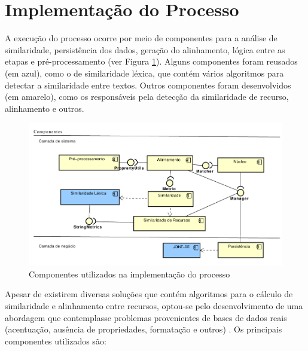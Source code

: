 \section{Implementação do Processo}
\label{sec:componentes}
A execução do processo ocorre por meio de componentes para a análise de similaridade, persistência dos dados, geração do alinhamento, lógica entre as etapas e pré-processamento (ver Figura \ref{fig:componentes}). Alguns componentes foram reusados (em azul), como o de similaridade léxica, que contém vários algoritmos para detectar a similaridade entre textos. Outros componentes foram desenvolvidos (em amarelo), como os responsáveis pela detecção da similaridade de recurso, alinhamento e outros.
% 
% 
%
%

\begin{figure}[!ht]
	\centering
	\includegraphics[width=1\textwidth]{./imagens/componentes.pdf}
    \caption{Componentes utilizados na implementação do processo}
	\label{fig:componentes}
\end{figure}

Apesar de existirem diversas soluções que contém algoritmos para o cálculo de similaridade e alinhamento entre recursos, optou-se pelo desenvolvimento de uma abordagem que contemplasse problemas provenientes de bases de dados reais (acentuação, ausência de propriedades, formatação e outros) \cite{castano2011ontology,ferrara2008towards}.
Os principais componentes utilizados são:

